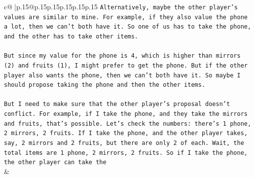 \documentclass{article}
\begin{document}
{\begin{supertabular}{c@{$\;$}|p{.15\linewidth}@{}p{.15\linewidth}p{.15\linewidth}p{.15\linewidth}p{.15\linewidth}p{.15\linewidth}}
{{{\texttt{Alternatively, maybe the other player's values are similar to mine. For example, if they also value the phone a lot, then we can't both have it. So one of us has to take the phone, and the other has to take other items. } \\
\\ 
\texttt{But since my value for the phone is 4, which is higher than mirrors (2) and fruits (1), I might prefer to get the phone. But if the other player also wants the phone, then we can't both have it. So maybe I should propose taking the phone and then the other items. } \\
\\ 
\texttt{But I need to make sure that the other player's proposal doesn't conflict. For example, if I take the phone, and they take the mirrors and fruits, that's possible. Let's check the numbers: there's 1 phone, 2 mirrors, 2 fruits. If I take the phone, and the other player takes, say, 2 mirrors and 2 fruits, but there are only 2 of each. Wait, the total items are 1 phone, 2 mirrors, 2 fruits. So if I take the phone, the other player can take the} \\
            }
        }
    }
    & \\ \\


\end{supertabular}}
\end{document}
